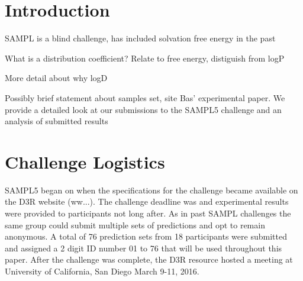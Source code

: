 \date{Received: date / Accepted: date}


\maketitle

\begin{abstract}
\end{abstract}



\section{Introduction}
\label{intro}
SAMPL is a blind challenge, has included solvation free energy in the past

What is a distribution coefficient? Relate to free energy, distiguish from logP

More detail about why logD

Possibly brief statement about samples set, site Bas' experimental paper. We provide a detailed look at our submissions to the SAMPL5 challenge and an analysis of submitted results


\section{Challenge Logistics}
\label{logistics}
SAMPL5 began on %
when the specifications for the challenge became available on the D3R website (ww...).  %
The challenge deadline was %
and experimental results were provided to participants not long after. 
As in past SAMPL challenges the same group could submit multiple sets of predictions and opt to remain anonymous. 
A total of 76 prediction sets from 18 participants were submitted and assigned a 2 digit ID number 01 to 76 that will be used throughout this paper. 
After the challenge was complete, the D3R resource hosted a meeting at University of California, San Diego March 9-11, 2016. %

